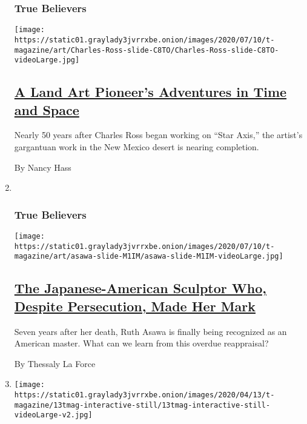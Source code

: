 \begin{enumerate}
{  \subsubsection{True Believers}\label{true-believers-10}}

  \texttt{[image: https://static01.graylady3jvrrxbe.onion/images/2020/07/10/t-magazine/art/Charles-Ross-slide-C8TO/Charles-Ross-slide-C8TO-videoLarge.jpg]}

  \hypertarget{a-land-art-pioneers-adventures-in-time-and-space}{%
  \subsection{\texorpdfstring{\href{/2020/07/21/t-magazine/charles-ross-artist.html}{A
  Land Art Pioneer's Adventures in Time and
  Space}}{A Land Art Pioneer's Adventures in Time and Space}}\label{a-land-art-pioneers-adventures-in-time-and-space}}

  Nearly 50 years after Charles Ross began working on ``Star Axis,'' the
  artist's gargantuan work in the New Mexico desert is nearing
  completion.

  By Nancy Hass
\item ~
  \hypertarget{true-believers-11}{%
  \subsubsection{True Believers}\label{true-believers-11}}

  \texttt{[image: https://static01.graylady3jvrrxbe.onion/images/2020/07/10/t-magazine/art/asawa-slide-M1IM/asawa-slide-M1IM-videoLarge.jpg]}

  \hypertarget{the-japanese-american-sculptor-who-despite-persecution-made-her-mark}{%
  \subsection{\texorpdfstring{\href{/2020/07/20/t-magazine/ruth-asawa.html}{The
  Japanese-American Sculptor Who, Despite Persecution, Made Her
  Mark}}{The Japanese-American Sculptor Who, Despite Persecution, Made Her Mark}}\label{the-japanese-american-sculptor-who-despite-persecution-made-her-mark}}

  Seven years after her death, Ruth Asawa is finally being recognized as
  an American master. What can we learn from this overdue reappraisal?

  By Thessaly La Force
\item
  \texttt{[image: https://static01.graylady3jvrrxbe.onion/images/2020/04/13/t-magazine/13tmag-interactive-still/13tmag-interactive-still-videoLarge-v2.jpg]}


\end{enumerate}
